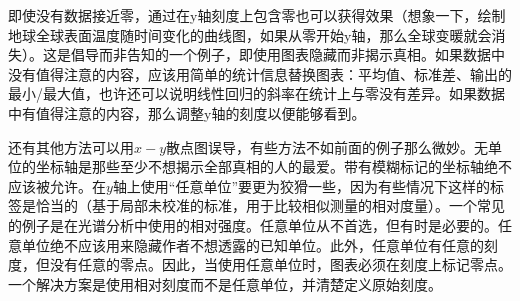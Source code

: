 即使没有数据接近零，通过在y轴刻度上包含零也可以获得效果（想象一下，绘制地球全球表面温度随时间变化的曲线图，如果从零开始y轴，那么全球变暖就会消失）。这是倡导而非告知的一个例子，即使用图表隐藏而非揭示真相。如果数据中没有值得注意的内容，应该用简单的统计信息替换图表：平均值、标准差、输出的最小/最大值，也许还可以说明线性回归的斜率在统计上与零没有差异。如果数据中有值得注意的内容，那么调整y轴的刻度以便能够看到。

还有其他方法可以用$x-y$散点图误导，有些方法不如前面的例子那么微妙。无单位的坐标轴是那些至少不想揭示全部真相的人的最爱。带有模糊标记的坐标轴绝不应该被允许。在$y$轴上使用“任意单位”要更为狡猾一些，因为有些情况下这样的标签是恰当的（基于局部未校准的标准，用于比较相似测量的相对度量）。一个常见的例子是在光谱分析中使用的相对强度。任意单位从不首选，但有时是必要的。任意单位绝不应该用来隐藏作者不想透露的已知单位。此外，任意单位有任意的刻度，但没有任意的零点。因此，当使用任意单位时，图表必须在刻度上标记零点。一个解决方案是使用相对刻度而不是任意单位，并清楚定义原始刻度。

